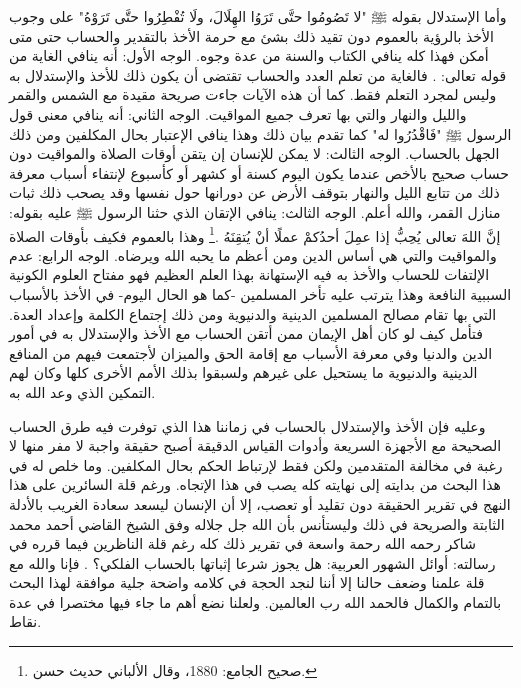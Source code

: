وأما الإستدلال بقوله ﷺ "لا تَصُومُوا حتَّى تَرَوُا الهِلَالَ، ولَا تُفْطِرُوا حتَّى تَرَوْهُ" على وجوب الأخذ بالرؤية بالعموم دون تقيد ذلك بشئ مع حرمة الأخذ بالتقدير والحساب حتى متى أمكن فهذا كله ينافي الكتاب والسنة من عدة وجوه. الوجه الأول: أنه ينافي الغاية من قوله تعالى: \quranayah*[10][5] {\footnotesize (\surahname*[10])}. فالغاية من تعلم العدد والحساب تقتضى أن يكون ذلك للأخذ والإستدلال به وليس لمجرد التعلم فقط. كما أن هذه الآيات جاءت صريحة مقيدة مع الشمس والقمر والليل والنهار والتي بها تعرف جميع المواقيت. الوجه الثاني: أنه ينافي معنى قول الرسول ﷺ
"فَاقْدُرُوا له" كما تقدم بيان ذلك وهذا ينافي الإعتبار بحال المكلفين ومن ذلك الجهل بالحساب. الوجه الثالث: لا يمكن للإنسان إن يتقن أوقات الصلاة والمواقيت دون حساب صحيح بالأخص عندما يكون اليوم كسنة أو كشهر أو كأسبوع لإنتفاء أسباب معرفة ذلك من تتابع الليل والنهار بتوقف الأرض عن دورانها حول نفسها وقد يصحب ذلك ثبات منازل القمر، والله أعلم. الوجه الثالث: ينافي الإتقان الذي حثنا الرسول ﷺ عليه بقوله: إنَّ اللهَ تعالى يُحِبُّ إذا عمِلَ أحدُكمْ عملًا أنْ يُتقِنَهُ \href{https://shamela.ws/book/21659/2761#p1}{\faExternalLink} \cite{jamaaSagheer}.\footnote{صحيح الجامع: 1880، وقال الألباني حديث حسن.} وهذا بالعموم فكيف بأوقات الصلاة والمواقيت والتي هي أساس الدين ومن أعظم ما يحبه الله ويرضاه. الوجه الرابع: عدم الإلتفات للحساب والأخذ به فيه الإستهانة بهذا العلم العظيم فهو مفتاح العلوم الكونية السببية النافعة وهذا يترتب عليه تأخر المسلمين -كما هو الحال اليوم- في الأخذ بالأسباب التي بها تقام مصالح المسلمين الدينية والدنيوية ومن ذلك إجتماع الكلمة وإعداد العدة. فتأمل كيف لو كان أهل الإيمان ممن أتقن الحساب مع الأخذ والإستدلال به في أمور الدين والدنيا وفي معرفة الأسباب مع إقامة الحق والميزان لأجتمعت فيهم من المنافع الدينية والدنيوية ما يستحيل على غيرهم ولسبقوا بذلك الأمم الأخرى كلها وكان لهم التمكين الذي وعد الله به.

وعليه فإن الأخذ والإستدلال بالحساب في زماننا هذا الذي توفرت فيه طرق الحساب الصحيحة مع الأجهزة السريعة وأدوات القياس الدقيقة أصبح حقيقة واجبة لا مفر منها لا رغبة في مخالفة المتقدمين ولكن فقط لإرتباط الحكم بحال المكلفين. وما خلص له في هذا البحث من بدايته إلى نهايته كله يصب في هذا الإتجاه. ورغم قلة السائرين على هذا النهج في تقرير الحقيقة دون تقليد أو تعصب، إلا أن الإنسان ليسعد سعادة الغريب بالأدلة الثابتة والصريحة في ذلك وليستأنس بأن الله جل جلاله وفق الشيخ القاضي أحمد محمد شاكر رحمه الله رحمة واسعة في تقرير ذلك كله رغم قلة الناظرين فيما قرره في رسالته: أوائل الشهور العربية: هل يجوز شرعا إثباتها بالحساب الفلكي؟ \cite{shuhur_ahmidShakir}. فإنا والله مع قلة علمنا وضعف حالنا إلا أننا  لنجد الحجة في كلامه واضحة جلية موافقة لهذا البحث بالتمام والكمال فالحمد الله رب العالمين. ولعلنا نضع أهم ما جاء فيها مختصرا في عدة نقاط. 

